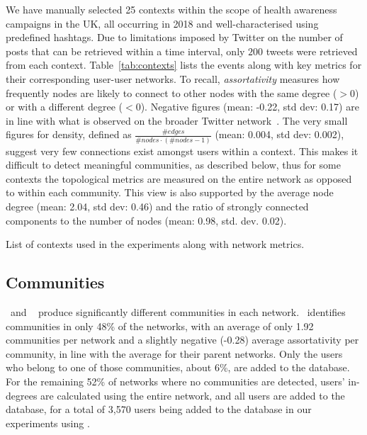 We have manually selected 25 contexts within the scope of health awareness campaigns in the UK, all occurring in 2018 and well-characterised using predefined hashtags.
Due to limitations imposed by Twitter on the number of posts that can be retrieved within a time interval, only $200$ tweets were retrieved from each context.
 Table~\ref{tab:contexts} lists the events along with key metrics for their corresponding user-user networks. 
To recall, \textit{assortativity} measures how frequently nodes are likely to connect to other nodes with the same degree ($>0$) or with a different degree ($<0$). 
Negative figures (mean: -0.22, std dev: 0.17) are in line with what is observed on the broader Twitter network~\cite{Fisher2017}.
%
The very small figures for density, defined as $\frac{\#edges }{\mathit{\mathit{\#nodes}} \cdot (\mathit{\#nodes} -1)}$ (mean: 0.004, std dev: 0.002), suggest very few connections exist amongst users within a context. 
This makes it difficult to detect meaningful communities, as described below, thus for some contexts the topological metrics are measured on the entire network as opposed to within each community.
This view is also supported by the average node degree (mean: 2.04, std dev: 0.46) and the ratio of strongly connected components to the number of nodes (mean: 0.98, std. dev. 0.02).

\begin{table}
	\tiny
	\resizebox{\textwidth}{!}{
	    
	}
	\caption{List of contexts used in the experiments along with network metrics.}
	\label{tab:contexts}
\vspace{-20pt}
\end{table}


\subsection{Communities}  \label{sec:communities-eval}

 \demon~and \infomap~ produce significantly different communities in each network. 
%
\demon~identifies communities in only 48\% of the networks, with an average of only 1.92 communities per network and 
a slightly negative  (-0.28) average assortativity  per community, in line with the average for their parent networks.
%
Only the users who belong to one of those communities, about 6\%, are added to the database.
%
For the remaining 52\% of networks where no communities are detected, users' in-degrees are calculated using the entire network, and all users are added to the database, 
for a total of 3,570 users being added to the database in our experiments using \demon.

